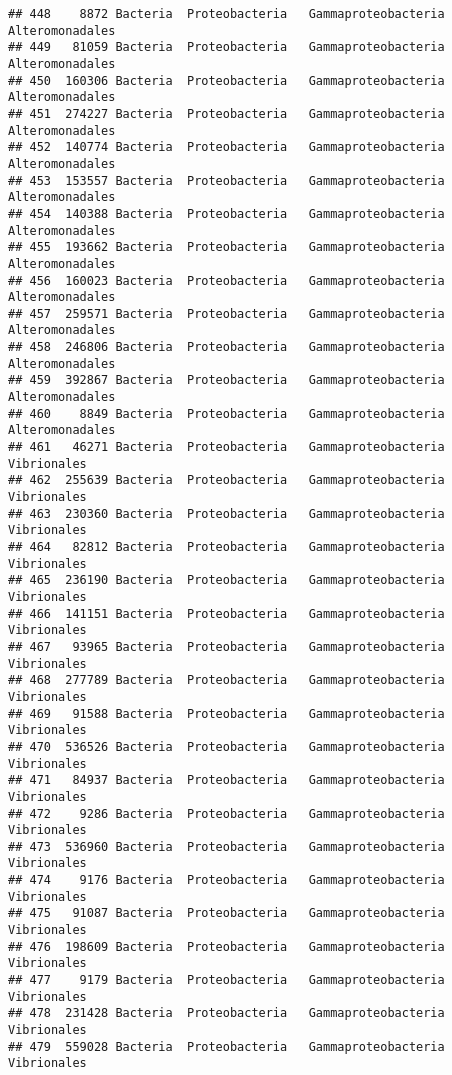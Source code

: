 \documentclass[
]{article}
\begin{document}
\begin{verbatim}
## 448    8872 Bacteria  Proteobacteria   Gammaproteobacteria     Alteromonadales
## 449   81059 Bacteria  Proteobacteria   Gammaproteobacteria     Alteromonadales
## 450  160306 Bacteria  Proteobacteria   Gammaproteobacteria     Alteromonadales
## 451  274227 Bacteria  Proteobacteria   Gammaproteobacteria     Alteromonadales
## 452  140774 Bacteria  Proteobacteria   Gammaproteobacteria     Alteromonadales
## 453  153557 Bacteria  Proteobacteria   Gammaproteobacteria     Alteromonadales
## 454  140388 Bacteria  Proteobacteria   Gammaproteobacteria     Alteromonadales
## 455  193662 Bacteria  Proteobacteria   Gammaproteobacteria     Alteromonadales
## 456  160023 Bacteria  Proteobacteria   Gammaproteobacteria     Alteromonadales
## 457  259571 Bacteria  Proteobacteria   Gammaproteobacteria     Alteromonadales
## 458  246806 Bacteria  Proteobacteria   Gammaproteobacteria     Alteromonadales
## 459  392867 Bacteria  Proteobacteria   Gammaproteobacteria     Alteromonadales
## 460    8849 Bacteria  Proteobacteria   Gammaproteobacteria     Alteromonadales
## 461   46271 Bacteria  Proteobacteria   Gammaproteobacteria         Vibrionales
## 462  255639 Bacteria  Proteobacteria   Gammaproteobacteria         Vibrionales
## 463  230360 Bacteria  Proteobacteria   Gammaproteobacteria         Vibrionales
## 464   82812 Bacteria  Proteobacteria   Gammaproteobacteria         Vibrionales
## 465  236190 Bacteria  Proteobacteria   Gammaproteobacteria         Vibrionales
## 466  141151 Bacteria  Proteobacteria   Gammaproteobacteria         Vibrionales
## 467   93965 Bacteria  Proteobacteria   Gammaproteobacteria         Vibrionales
## 468  277789 Bacteria  Proteobacteria   Gammaproteobacteria         Vibrionales
## 469   91588 Bacteria  Proteobacteria   Gammaproteobacteria         Vibrionales
## 470  536526 Bacteria  Proteobacteria   Gammaproteobacteria         Vibrionales
## 471   84937 Bacteria  Proteobacteria   Gammaproteobacteria         Vibrionales
## 472    9286 Bacteria  Proteobacteria   Gammaproteobacteria         Vibrionales
## 473  536960 Bacteria  Proteobacteria   Gammaproteobacteria         Vibrionales
## 474    9176 Bacteria  Proteobacteria   Gammaproteobacteria         Vibrionales
## 475   91087 Bacteria  Proteobacteria   Gammaproteobacteria         Vibrionales
## 476  198609 Bacteria  Proteobacteria   Gammaproteobacteria         Vibrionales
## 477    9179 Bacteria  Proteobacteria   Gammaproteobacteria         Vibrionales
## 478  231428 Bacteria  Proteobacteria   Gammaproteobacteria         Vibrionales
## 479  559028 Bacteria  Proteobacteria   Gammaproteobacteria         Vibrionales

\end{verbatim}
\end{document}
